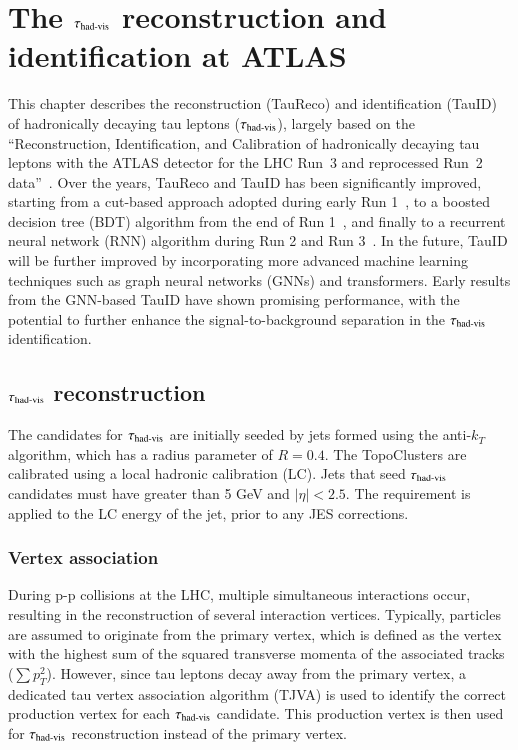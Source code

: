 
\chapter{The $\tau_{\text{had-vis}}$ reconstruction and identification at ATLAS}

\graphicspath{{1_MainChapters/Chap4_TauRec/figs}}
    This chapter describes the reconstruction (TauReco) and identification (TauID) of hadronically decaying tau leptons ($\tau_{\text{had-vis}}$),
    largely based on the ``Reconstruction, Identification, and Calibration of hadronically decaying tau leptons 
    with the ATLAS detector for the LHC Run~3 and reprocessed Run~2 data''~\cite{ATL-PHYS-PUB-2022-044}. Over the 
    years, TauReco and TauID has been significantly improved, starting from 
    a cut-based approach adopted during early Run 1~\cite{ATL-PHYS-PUB-2010-001}, to a boosted decision tree (BDT)
    algorithm from the end of Run 1~\cite{PERF-2013-06}, and finally to a recurrent neural network (RNN) algorithm
    during Run 2 and Run 3~\cite{ATL-PHYS-PUB-2022-044}. In the future, TauID will be further improved by
    incorporating more advanced machine learning techniques such as graph neural networks (GNNs) and transformers.
    Early results from the GNN-based TauID have shown promising performance, with the potential to further enhance
    the signal-to-background separation in the $\tau_{\text{had-vis}}$ identification.

\section{$\tau_{\text{had-vis}}$ reconstruction}
    The candidates for $\tau_{\text{had-vis}}$ are initially seeded by jets formed using the 
    anti-\(k_T\) algorithm, which has a radius parameter of $R = 0.4$. 
    The TopoClusters are calibrated using a local hadronic calibration (LC). 
    Jets that seed $\tau_{\text{had-vis}}$ candidates must have \pt greater than 5 GeV and $|\eta| < 2.5$. 
    The \pT requirement is applied to the LC energy of the jet, prior to any JES corrections. 

    \subsection{Vertex association}
        During p-p collisions at the LHC, multiple simultaneous interactions occur, resulting in the reconstruction 
        of several interaction vertices. Typically, particles are assumed to originate from the primary vertex, 
        which is defined as the vertex with the highest sum of the squared transverse momenta of the associated 
        tracks (\(\sum p_T^2\)). However, since tau leptons decay away from the primary vertex, a dedicated 
        tau vertex association algorithm (TJVA) is used to identify the correct production vertex for each 
        $\tau_{\text{had-vis}}$ candidate. This production vertex is then used for $\tau_{\text{had-vis}}$
        reconstruction instead of the primary vertex.
        
